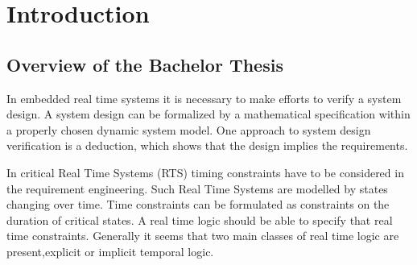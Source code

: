 






\chapter{Introduction}  %
\label{chapter:1}
\ifpdf
    \graphicspath{{Chapter1/Figs/Raster/}{Chapter1/Figs/PDF/}{Chapter1/Figs/}}
\else
    \graphicspath{{Chapter1/Figs/Vector/}{Chapter1/Figs/}}
\fi


\section{Overview of the Bachelor Thesis } %

In embedded real time systems it is necessary to make efforts to verify a system design.
A system design can be formalized by a mathematical specification within a properly chosen dynamic system model.
One approach to system design verification is a deduction, which shows that the design implies the requirements. 

In critical Real Time Systems (RTS) timing constraints have to be considered in the requirement engineering.
Such Real Time Systems are modelled by states changing over time.
Time constraints can be formulated as constraints on the duration of critical states. 
A real time logic should be able to specify that real time constraints. Generally it seems that two main classes
of real time logic are present,explicit or implicit temporal logic.\cite{210306} 

